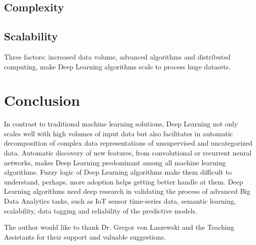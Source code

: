 \documentclass[sigconf]{acmart}
\begin{document}
	\subsection{Complexity}
	
	\subsection{Scalability}
	
    Three factors: increased data volume, advanced algorithms and distributed computing, make Deep Learning algorithms scale to process huge datasets. 
		
		\begin{comment}
	Deep Learning: With massive amounts of computational power, machines can now recognize objects and translate speech in real time. Artificial intelligence is finally getting smart. Like cats. Last June, Google demonstrated one of the largest neural networks yet, with more than a billion connections. A team led by Stanford computer science professor Andrew Ng and Google Fellow Jeff Dean showed the system images from 10 million randomly selected YouTube videos. One simulated neuron in the software model fixated on images of cats. Others focused on human faces, yellow flowers, and other objects. And thanks to the power of deep learning, the system identified these discrete objects even though no humans had ever defined or labeled them with the accuracy rate jumped above 50 percent.
	
	Training the many layers of virtual neurons in the experiment took 16,000 computer processors—the kind of computing infrastructure that Google has developed for its search engine and other services. At least 80 percent of the recent advances in AI can be attributed to the availability of more computer power.
	\end{comment}
	
	\section{Conclusion}		

	In contrast to traditional machine learning solutions, Deep Learning not only scales well with high volumes of input data but also facilitates in automatic decomposition of complex data representations of unsupervised and uncategorized data. Automatic discovery of new features, from convolutional or recurrent neural networks, makes Deep Learning predominant among all machine learning algorithms. Fuzzy logic of Deep Learning algorithms make them difficult to understand, perhaps, more adoption helps getting better handle at them. Deep Learning algorithms need deep research in validating the process of advanced Big Data Analytics tasks, such as IoT sensor time-series data, semantic learning, scalability, data tagging and reliability of the predictive models.  
	
	\begin{acks}		
	
		The author would like to thank Dr. Gregor von Laszewski and the Teaching Assistants for their support and valuable suggestions.
		
	\end{acks}

	
	 
	

	
\end{document}
